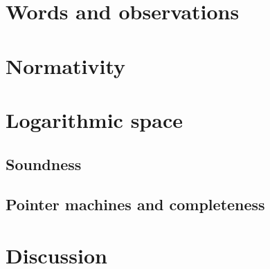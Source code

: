 \section{Words and observations}\label{sec:words}
	
	
	
\section{Normativity}\label{sec:normativity}
	

\section{Logarithmic space}\label{sec:logspace}
	\subsection{Soundness}
	
	\subsection{Pointer machines and completeness}
	

\section*{Discussion}




\thispagestyle{empty}
